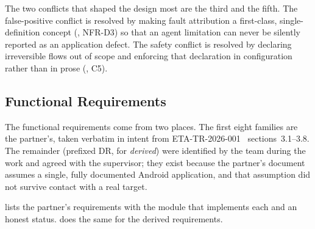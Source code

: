 The two conflicts that shaped the design most are the third and the fifth. The
false-positive conflict is resolved by making fault attribution a first-class,
single-definition concept (, NFR-D3) so that an agent
limitation can never be silently reported as an application defect. The safety
conflict is resolved by declaring irreversible flows out of scope and enforcing
that declaration in configuration rather than in prose
(, C5).

\subsection{Functional Requirements}
\label{subsec:fr}

The functional requirements come from two places. The first eight families are
the partner's, taken verbatim in intent from ETA-TR-2026-001~\cite{etatr}
sections~3.1--3.8. The remainder (prefixed DR, for
\emph{derived}) were identified by the team during the work and agreed with the
supervisor; they exist because the partner's document assumes a single, fully
documented Android application, and that assumption did not survive contact
with a real target.

 lists the partner's requirements with the module that
implements each and an honest status.  does the same for
the derived requirements.


